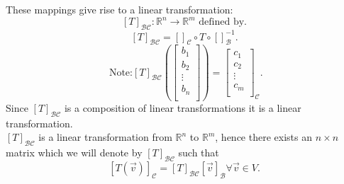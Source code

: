 \documentclass{report}
\begin{document}
     \\
     \\
 These mappings give rise to a linear transformation:
 \[
   \left[ T \right] _{ \mathcal{B}  \mathcal{C} } : \mathbb{R} ^{n} \to \mathbb{R} ^{m} \text{ defined by}
 .\] 
 \[
   \left[ T \right] _{ \mathcal{B}  \mathcal{C} } = \left[  \right] _{ \mathcal{C}} {\circ}  T \circ \left[  \right] _{ \mathcal{B}} ^{-1} 
 .\] 
 \[
 \text{ Note:} \left[ T \right] _{ \mathcal{B}  \mathcal{C} } \left(  \begin{bmatrix}
 b_1\\
 b_2\\
 \vdots\\
 b_n\\
 \end{bmatrix}
   \right)     = \begin{bmatrix}
   c_1\\
   c_2\\
   \vdots \\
   c_m\\
   \end{bmatrix}  _{ \mathcal{C}}
 .\] 
Since $  \left[ T \right] _{ \mathcal{B} \mathcal{C}}$ is a composition of linear transformations it is a linear transformation.\\
    \thm{}
    {
      $ \left[ T \right] _{ \mathcal{B} \mathcal{C}}$ is a linear transformation from $ \mathbb{R} ^{n}$ to $ \mathbb{R} ^{m}$, hence there exists an $n \times n$  matrix which we will denote by $ \left[ T \right]_{ \mathcal{B} \mathcal{C}}$ such that 
      \[
        \left[ T \left( \vec{ v}  \right)  \right] _{ \mathcal{C}}= \left[ T \right] _{ \mathcal{B} \mathcal{C}} \left[ \vec{ v}  \right] _{ \mathcal{B}} \forall  \vec{ v} \in V
      .\] 
    }
\end{document}
